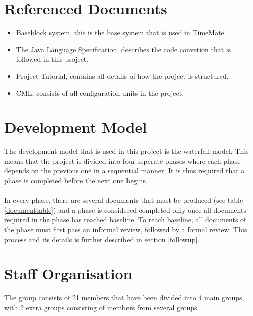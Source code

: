 \documentclass{article}
\begin{document}
\section{Referenced Documents}
    \begin{itemize}
        \item Baseblock system,  this is the base system that is used in TimeMate.
        \item \href{https://docs.oracle.com/javase/specs/jls/se11/html/index.html}{The Java Language Specification}, describes the code convetion that is followed in this project.
        \item \label{PH} Project Tutorial, contains all details of how the project is structured.
        \item CML, consists of all configuration units in the project.
    \end{itemize}
    

\section{Development Model} %
    The development model that is used in this project is the waterfall model. This
    means that the project is divided into four seperate phases where each phase depends
    on the previous one in a sequential manner. It is thus required that a phase is
    completed before the next one begins.
    \\ \\
    In every phase, there are several documents that must be produced (see table \ref{documenttable}) and a phase
    is considered completed only once all documents required in the phase has reached baseline.
    To reach baseline, all documents of the phase must first pass an informal review, 
    followed by a formal review. This process and its details is further described in section \ref{followup}.
    
\section{Staff Organisation} %
    The group consists of 21 members that have been divided into 4 main groups, with 2 extra groups consisting of members from several groups. 
    
\end{document}

